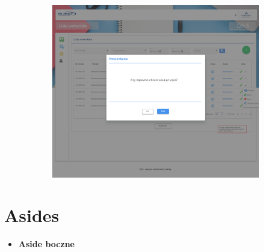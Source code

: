 \documentclass[
  a4paper,
  DIV=11,
  numbers=noendperiod,
  oneside,
  open=any]{scrreprt}
\providecommand{\tightlist}{%
  \setlength{\itemsep}{0pt}\setlength{\parskip}{0pt}}\usepackage{longtable,booktabs,array}
\begin{document}
\begin{figure}
\begin{minipage}{0.33\linewidth}
\begin{figure}[H]
{}


\end{figure}%

\end{minipage}%
%
\begin{minipage}{0.33\linewidth}

\begin{figure}[H]

{\centering \includegraphics{images/wniosek3.png}

}


\end{figure}%

\end{minipage}%

\end{figure}%

\section{Asides}\label{asides}

\begin{itemize}
\tightlist
\item
  \textbf{Aside boczne}
\end{itemize}

{}
\end{document}
